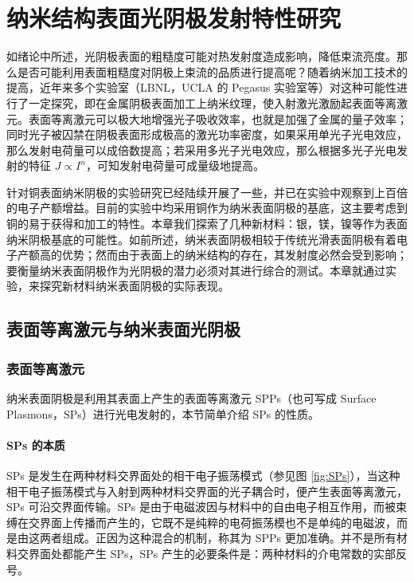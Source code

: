 \chapter{纳米结构表面光阴极发射特性研究}
\label{chap:NPC}

如绪论中所述，光阴极表面的粗糙度可能对热发射度造成影响，降低束流亮度。那么是否可能利用表面粗糙度对阴极上束流的品质进行提高呢？随着纳米加工技术的提高，近年来多个实验室（LBNL，UCLA 的 Pegasus 实验室等）对这种可能性进行了一定探究，即在金属阴极表面加工上纳米纹理，使入射激光激励起表面等离激元\cite{Polyakov:2013aa,Li:2013aa}。表面等离激元可以极大地增强光子吸收效率，也就是加强了金属的量子效率；同时光子被囚禁在阴极表面形成极高的激光功率密度，如果采用单光子光电效应，那么发射电荷量可以成倍数提高；若采用多光子光电效应，那么根据多光子光电发射的特征 $J \propto I^n$，可知发射电荷量可成量级地提高\cite{Li:2013aa}。

针对铜表面纳米阴极的实验研究已经陆续开展了一些\cite{Polyakov:2013aa,Li:2013aa}，并已在实验中观察到上百倍的电子产额增益\cite{Li:2013aa}。目前的实验中均采用铜作为纳米表面阴极的基底，这主要考虑到铜的易于获得和加工的特性。本章我们探索了几种新材料：银，镁，镍等作为表面纳米阴极基底的可能性。如前所述，纳米表面阴极相较于传统光滑表面阴极有着电子产额高的优势；然而由于表面上的纳米结构的存在，其发射度必然会受到影响；要衡量纳米表面阴极作为光阴极的潜力必须对其进行综合的测试。本章就通过实验，来探究新材料纳米表面阴极的实际表现。

\section{表面等离激元与纳米表面光阴极}
\subsection{表面等离激元}
纳米表面阴极是利用其表面上产生的表面等离激元 SPPs（也可写成 Surface Plasmons，SPs）进行光电发射的，本节简单介绍 SPs 的性质。
\subsubsection{SPs 的本质}
SPs 是发生在两种材料交界面处的相干电子振荡模式（参见图 \ref{fig:SPs}）\cite{Ritchie:1957aa}，当这种相干电子振荡模式与入射到两种材料交界面的光子耦合时，便产生表面等离激元，SPs 可沿交界面传输。SPs 是由于电磁波因与材料中的自由电子相互作用，而被束缚在交界面上传播而产生的，它既不是纯粹的电荷振荡模也不是单纯的电磁波，而是由这两者组成。正因为这种混合的机制，称其为 SPPs 更加准确。并不是所有材料交界面处都能产生 SPs，SPs 产生的必要条件是：两种材料的介电常数的实部反号。

